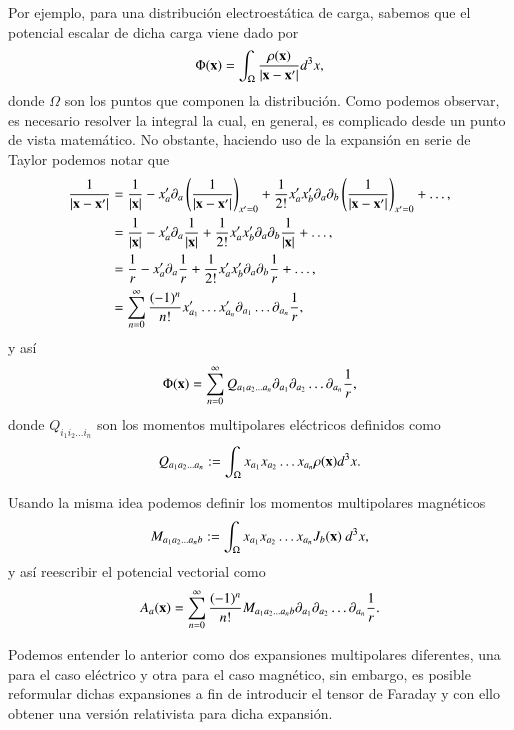 Por ejemplo, para una distribución electroestática de carga, sabemos que el potencial escalar de dicha carga viene dado por
\begin{equation}
\Phi(\vb{x}) = \int_{\Omega} \frac{\rho(\vb{x})}{|\vb{x} - \vb{x}'|} d^3x,
\end{equation}
donde $\Omega$ son los puntos que componen la distribución. Como podemos observar, es necesario resolver la integral la cual, en general, es complicado desde un punto de vista matemático. No obstante, haciendo uso de la expansión en serie de Taylor podemos notar que
\begin{align}
\frac{1}{|\vb{x} - \vb{x}'|} &= \frac{1}{|\vb{x}|} - x'_a \partial_a \left( \frac{1}{|\vb{x} - \vb{x}'|} \right)_{x'=0} + \frac{1}{2!} x'_a x'_b \partial_a \partial_b \left( \frac{1}{|\vb{x} - \vb{x}'|} \right)_{x'=0} + \dots,\\
&= \frac{1}{|\vb{x}|} - x'_a \partial_a \frac{1}{|\vb{x}|} + \frac{1}{2!} x'_a x'_b \partial_a \partial_b \frac{1}{|\vb{x}|} + \dots,\\
&= \frac{1}{r}  - x'_a \partial_a \frac{1}{r} + \frac{1}{2!} x'_a x'_b \partial_a \partial_b \frac{1}{r} + \dots,\\
&= \sum_{n=0}^{\infty} \frac{(-1)^n}{n!} x'_{a_1} \dots x'_{a_n} \partial_{a_1} \dots \partial_{a_n} \frac{1}{r},
\end{align}
y así
\begin{equation}
\Phi(\vb{x}) = \sum_{n=0}^{\infty} Q_{a_1 a_2 \dots a_n} \partial_{a_1} \partial_{a_2} \dots \partial_{a_n} \frac{1}{r},
\end{equation}
donde $Q_{i_1 i_2 \dots i_n}$ son los momentos multipolares eléctricos definidos como
\begin{equation}
Q_{a_1 a_2 \dots a_n} := \int_{\Omega} x_{a_1} x_{a_2} \dots x_{a_n} \rho(\vb{x}) d^3x.
\end{equation}

Usando la misma idea podemos definir los momentos multipolares magnéticos
\begin{equation}
M_{a_1 a_2 \dots a_n b} := \int_{\Omega} x_{a_1} x_{a_2} \dots x_{a_n} J_b(\vb{x}) \  d^3x,
\end{equation}
y así reescribir el potencial vectorial como
\begin{equation}
A_a(\vb{x}) = \sum_{n=0}^{\infty} \frac{(-1)^n}{n!} M_{a_1 a_2 \dots a_n b} \partial_{a_1} \partial_{a_2} \dots \partial_{a_n} \frac{1}{r}.
\end{equation}

Podemos entender lo anterior como dos expansiones multipolares diferentes, una para el caso eléctrico y otra para el caso magnético, sin embargo, es posible reformular dichas expansiones a fin de introducir el tensor de Faraday y con ello obtener una versión relativista para dicha expansión.

